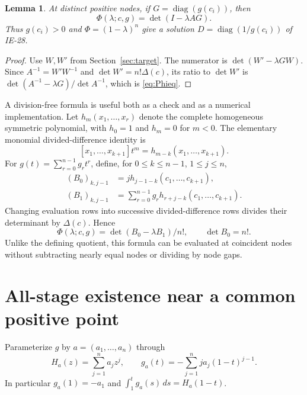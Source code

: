 \documentclass[11pt]{article}
\newtheorem{lemma}[theorem]{Lemma}
\theoremstyle{remark}\newtheorem{remark}[theorem]{Remark}
\DeclareMathOperator{\diag}{diag}\DeclareMathOperator{\tr}{tr}
\begin{document}
\begin{lemma}\label{lem:Phi}
At distinct positive nodes, if $G=\diag(g(c_i))$, then
\begin{equation}\label{eq:Phieq}
 \Phi(\lambda;c,g)=\det(I-\lambda AG).
\end{equation}
Thus $g(c_i)>0$ and $\Phi=(1-\lambda)^n$ give a solution
$D=\diag(1/g(c_i))$ of IE-28.
\end{lemma}
\begin{proof}
Use $W,W'$ from Section~\ref{sec:target}. The numerator is
$\det(W'-\lambda GW)$. Since $A^{-1}=W'W^{-1}$ and
$\det W'=n!\Delta(c)$, its ratio to $\det W'$ is
$\det(A^{-1}-\lambda G)/\det A^{-1}$, which is \eqref{eq:Phieq}.
\end{proof}

A division-free formula is useful both as a check and as a numerical
implementation. Let $h_m(x_1,\ldots,x_r)$ denote the complete homogeneous
symmetric polynomial, with $h_0=1$ and $h_m=0$ for $m<0$. The elementary
monomial divided-difference identity is
\[
 [x_1,\ldots,x_{k+1}]t^m=h_{m-k}(x_1,\ldots,x_{k+1}).
\]
For $g(t)=\sum_{r=0}^{n-1}g_rt^r$, define, for $0\le k\le n-1$,
$1\le j\le n$,
\begin{align}\label{eq:pencil}
 (B_0)_{k,j-1}&=j h_{j-1-k}(c_1,\ldots,c_{k+1}),\\
 (B_1)_{k,j-1}&=\sum_{r=0}^{n-1}g_rh_{r+j-k}(c_1,\ldots,c_{k+1}).\nonumber
\end{align}
Changing evaluation rows into successive divided-difference rows divides their
determinant by $\Delta(c)$. Hence
\begin{equation}\label{eq:pencilidentity}
 \Phi(\lambda;c,g)=\det(B_0-\lambda B_1)/n!,\qquad \det B_0=n!.
\end{equation}
Unlike the defining quotient, this formula can be evaluated at coincident
nodes without subtracting nearly equal nodes or dividing by node gaps.

\section{All-stage existence near a common positive point}\label{sec:local}
Parameterize $g$ by $a=(a_1,\ldots,a_n)$ through
\begin{equation}\label{eq:Ha}
 H_a(z)=\sum_{j=1}^n a_jz^j,\qquad
 g_a(t)=-\sum_{j=1}^n j a_j(1-t)^{j-1}.
\end{equation}
In particular $g_a(1)=-a_1$ and $\int_1^t g_a(s)\,ds=H_a(1-t)$.
\end{document}
